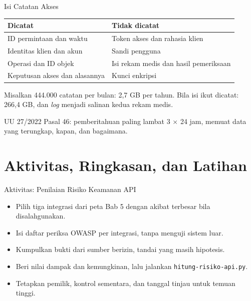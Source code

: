 \documentclass[aspectratio=169, table, 12pt]{beamer}
\begin{document}
\begin{frame}{{\Large Isi Catatan Akses}}
  \small
  \begin{tabularx}{\textwidth}{>{\raggedright\arraybackslash}X >{\raggedright\arraybackslash}X}
    \hline
    \textbf{Dicatat} & \textbf{Tidak dicatat} \\ \hline
    ID permintaan dan waktu & Token akses dan rahasia klien \\ \hline
    Identitas klien dan akun & Sandi pengguna \\ \hline
    Operasi dan ID objek & Isi rekam medis dan hasil pemeriksaan \\ \hline
    Keputusan akses dan alasannya & Kunci enkripsi \\ \hline
  \end{tabularx}

  \vspace{8pt}
  Misalkan 444.000 catatan per bulan: 2,7 GB per tahun. Bila isi ikut dicatat: 266,4 GB, dan \textit{log} menjadi salinan kedua rekam medis.

  \vspace{4pt}
  UU 27/2022 Pasal 46: pemberitahuan paling lambat 3 $\times$ 24 jam, memuat data yang terungkap, kapan, dan bagaimana.
\end{frame}

\section{Aktivitas, Ringkasan, dan Latihan}

\begin{frame}{{\Large Aktivitas: Penilaian Risiko Keamanan API}}
  \vspace{6pt}
  \begin{itemize}
    \item Pilih tiga integrasi dari peta Bab 5 dengan akibat terbesar bila disalahgunakan.
    \item Isi daftar periksa OWASP per integrasi, tanpa menguji sistem luar.
    \item Kumpulkan bukti dari sumber berizin, tandai yang masih hipotesis.
    \item Beri nilai dampak dan kemungkinan, lalu jalankan \texttt{hitung-risiko-api.py}.
    \item Tetapkan pemilik, kontrol sementara, dan tanggal tinjau untuk temuan tinggi.
  \end{itemize}
\end{frame}
\end{document}

